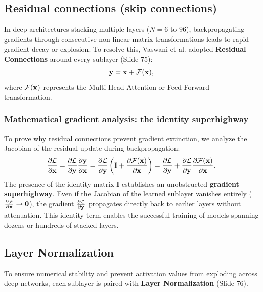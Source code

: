 \documentclass[../../main.tex]{subfiles}
\begin{document}
\subsection{Residual connections (skip connections)}
\label{subsec:residual_connections_deep}

In deep architectures stacking multiple layers ($N = 6$ to $96$), backpropagating gradients through consecutive non-linear matrix transformations leads to rapid gradient decay or explosion. To resolve this, Vaswani et al. adopted \textbf{Residual Connections} \cite{he2016deep} around every sublayer (Slide 75):
\begin{equation}
\label{eq:residual_shortcut_op}
\mathbf{y} = \mathbf{x} + \mathcal{F}(\mathbf{x}),
\end{equation}
where $\mathcal{F}(\mathbf{x})$ represents the Multi-Head Attention or Feed-Forward transformation.

\subsubsection{Mathematical gradient analysis: the identity superhighway}
To prove why residual connections prevent gradient extinction, we analyze the Jacobian of the residual update during backpropagation:
\begin{equation}
\label{eq:residual_gradient_flow_ch5}
\frac{\partial \mathcal{L}}{\partial \mathbf{x}} = \frac{\partial \mathcal{L}}{\partial \mathbf{y}} \frac{\partial \mathbf{y}}{\partial \mathbf{x}} = \frac{\partial \mathcal{L}}{\partial \mathbf{y}} \left( \mathbf{I} + \frac{\partial \mathcal{F}(\mathbf{x})}{\partial \mathbf{x}} \right) = \frac{\partial \mathcal{L}}{\partial \mathbf{y}} + \frac{\partial \mathcal{L}}{\partial \mathbf{y}} \frac{\partial \mathcal{F}(\mathbf{x})}{\partial \mathbf{x}}.
\end{equation}
The presence of the identity matrix $\mathbf{I}$ establishes an unobstructed \textbf{gradient superhighway}. Even if the Jacobian of the learned sublayer vanishes entirely ($\frac{\partial \mathcal{F}}{\partial \mathbf{x}} \to \mathbf{0}$), the gradient $\frac{\partial \mathcal{L}}{\partial \mathbf{y}}$ propagates directly back to earlier layers without attenuation. This identity term enables the successful training of models spanning dozens or hundreds of stacked layers.

\subsection{Layer Normalization}
\label{subsec:layer_normalization_deep}

To ensure numerical stability and prevent activation values from exploding across deep networks, each sublayer is paired with \textbf{Layer Normalization} \cite{ba2016layer} (Slide 76).
\end{document}
